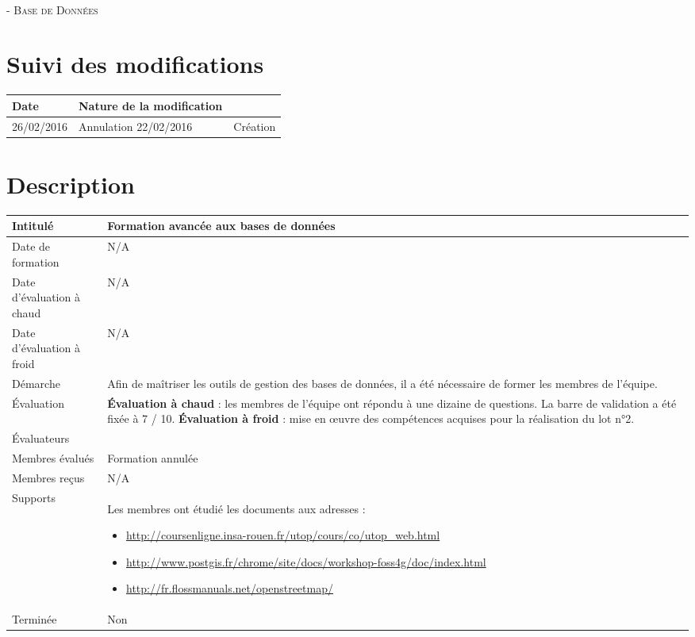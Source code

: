 \documentclass[asi, sansVersion]{picInsa}
\begin{document}
	\begin{center}
		\LARGE
		\textsc{
			\FF{}\\
			 - Base de Données
		}
	\end{center}
	\vspace{0.5cm}

	\section*{Suivi des modifications}
		\begin{table}[H]
			\centering
			\begin{tabularx}{18cm}{|p{1.7cm}|X|p{4cm}|}
				\hline
				\rowcolor[gray]{0.90} Date & Nature de la modification \\
				\hline
				26/02/2016 & Annulation
				22/02/2016 & Création \\
				\hline
			\end{tabularx}
		\end{table}

	\section*{Description}
		\begin{longtable}{|p{}|p{}|}
			\hline
			\cellcolor{gris2} Intitulé & Formation avancée aux bases de données\\\hline
			\cellcolor{gris2} Date de formation & N/A \\\hline
			\cellcolor{gris2} Date d'évaluation à chaud & N/A \\\hline
			\cellcolor{gris2} Date d'évaluation à froid & N/A \\\hline
			\cellcolor{gris2} Démarche & Afin de maîtriser les outils de gestion des bases de données, il a été nécessaire de former les membres de l'équipe.\\\hline
			\cellcolor{gris2} Évaluation &
				\textbf{Évaluation à chaud} : les membres de l'équipe ont répondu à une dizaine de questions. La barre de validation a été fixée à 7 / 10.\newline
				\textbf{Évaluation à froid} : mise en œuvre des compétences acquises pour la réalisation du lot n°2.\\\hline
			\cellcolor{gris2} Évaluateurs & \Sergi{}\\\hline
			\cellcolor{gris2} Membres évalués & Formation annulée\\\hline
			\cellcolor{gris2} Membres reçus & N/A \\\hline
			\cellcolor{gris2} Supports & Les membres ont étudié les documents aux adresses : \begin{itemize}
			\item \url{http://coursenligne.insa-rouen.fr/utop/cours/co/utop_web.html}
			\item \url{http://www.postgis.fr/chrome/site/docs/workshop-foss4g/doc/index.html}
			\item \url{http://fr.flossmanuals.net/openstreetmap/}
		\end{itemize}
			 \\\hline
			\cellcolor{gris2} Terminée & Non \\\hline
		\end{longtable}
\end{document}
